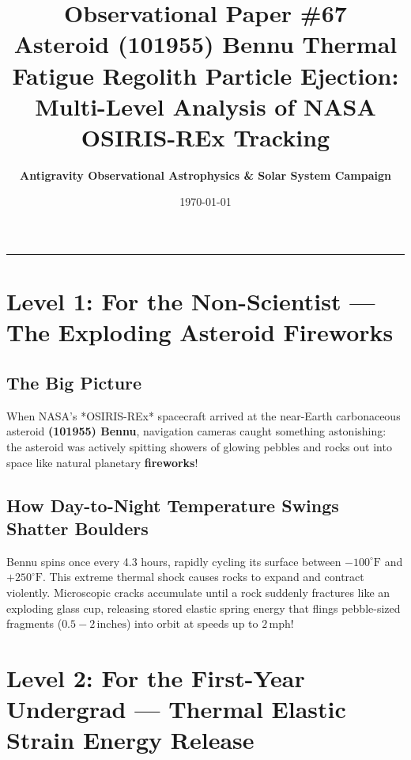 \documentclass[11pt,a4paper]{article}
\title{\Huge \textbf{Observational Paper \#67}\\ \Large Asteroid (101955) Bennu Thermal Fatigue Regolith Particle Ejection: Multi-Level Analysis of NASA OSIRIS-REx Tracking}
\author{\textbf{Antigravity Observational Astrophysics \& Solar System Campaign}}
\date{\today}
\begin{document}
\maketitle

\vspace{-1em}
\begin{center}
\rule{\textwidth}{1.5pt}
\end{center}

\section*{Level 1: For the Non-Scientist — The Exploding Asteroid Fireworks}

\subsection*{The Big Picture}
When NASA's *OSIRIS-REx* spacecraft arrived at the near-Earth carbonaceous asteroid \textbf{(101955) Bennu}, navigation cameras caught something astonishing: the asteroid was actively spitting showers of glowing pebbles and rocks out into space like natural planetary \textbf{fireworks}!

\subsection*{How Day-to-Night Temperature Swings Shatter Boulders}
Bennu spins once every 4.3 hours, rapidly cycling its surface between $-100^\circ\text{F}$ and $+250^\circ\text{F}$. This extreme thermal shock causes rocks to expand and contract violently. Microscopic cracks accumulate until a rock suddenly fractures like an exploding glass cup, releasing stored elastic spring energy that flings pebble-sized fragments ($0.5 - 2\,\text{inches}$) into orbit at speeds up to $2\,\text{mph}$!

\newpage

\section*{Level 2: For the First-Year Undergrad — Thermal Elastic Strain Energy Release}
\end{document}
